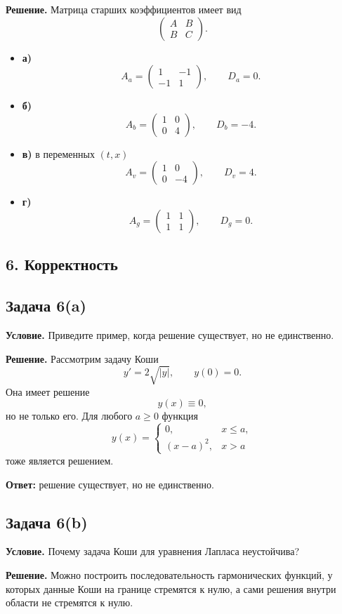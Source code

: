 \documentclass[a4paper,12pt]{article}
\newcommand{\Task}[2]{\subsection*{Задача #1}\textbf{Условие.} #2}
\newcommand{\Solution}{\textbf{Решение.}}
\begin{document}
\Solution
Матрица старших коэффициентов имеет вид
\[
\begin{pmatrix}
A & B\\
B & C
\end{pmatrix}.
\]

\begin{itemize}
  \item \textbf{а)}
  \[
  A_a=
  \begin{pmatrix}
  1 & -1\\
  -1 & 1
  \end{pmatrix},
  \qquad
  D_a=0.
  \]

  \item \textbf{б)}
  \[
  A_b=
  \begin{pmatrix}
  1 & 0\\
  0 & 4
  \end{pmatrix},
  \qquad
  D_b=-4.
  \]

  \item \textbf{в)} в переменных $(t,x)$
  \[
  A_v=
  \begin{pmatrix}
  1 & 0\\
  0 & -4
  \end{pmatrix},
  \qquad
  D_v=4.
  \]

  \item \textbf{г)}
  \[
  A_g=
  \begin{pmatrix}
  1 & 1\\
  1 & 1
  \end{pmatrix},
  \qquad
  D_g=0.
  \]
\end{itemize}

\subsection*{6. Корректность}

\Task{6(a)}{Приведите пример, когда решение существует, но не единственно.}

\Solution
Рассмотрим задачу Коши
\[
y'=2\sqrt{|y|}, \qquad y(0)=0.
\]
Она имеет решение
\[
y(x)\equiv 0,
\]
но не только его. Для любого $a\ge 0$ функция
\[
y(x)=
\begin{cases}
0, & x\le a,\\
(x-a)^2, & x>a
\end{cases}
\]
тоже является решением.

\textbf{Ответ:} решение существует, но не единственно.

\Task{6(b)}{Почему задача Коши для уравнения Лапласа неустойчива?}

\Solution
Можно построить последовательность гармонических функций, у которых данные Коши на границе стремятся к нулю, а сами решения внутри области не стремятся к нулю.
\end{document}
